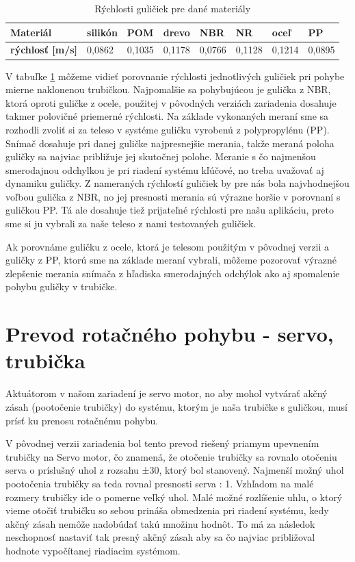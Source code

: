 \begin{table}[ht]
	\centering
	\begin{tabular}{|l|l|l|l|l|l|l|l|}
		\hline
		\textbf{Materiál}           & silikón & POM    & drevo  & NBR                            & NR     & oceľ                           & PP                             \\ \hline
		\textbf{rýchlosť {[}m/s{]}} & 0,0862  & 0,1035 & 0,1178 & \cellcolor[HTML]{9AFF99}0,0766 & 0,1128 & \cellcolor[HTML]{FFCCC9}0,1214 & \cellcolor[HTML]{FFFFFF}0,0895 \\ \hline
	\end{tabular}
    \caption{Rýchlosti guličiek pre dané materiály}
    \label{TABULKA_2_2}
\end{table}

V tabuľke \ref{TABULKA_2_2} môžeme vidieť porovnanie rýchlosti jednotlivých guličiek pri pohybe mierne naklonenou trubičkou. Najpomalšie sa pohybujúcou je gulička z NBR, ktorá oproti guličke z ocele, použitej v pôvodných verziách zariadenia dosahuje takmer polovičné priemerné rýchlosti.  
Na základe vykonaných meraní sme sa rozhodli zvoliť si za teleso v systéme guličku vyrobenú z polypropylénu (PP). Snímač dosahuje pri danej guličke najpresnejšie merania, takže meraná poloha guličky sa najviac približuje jej skutočnej polohe. Meranie s čo najmenšou smerodajnou odchylkou je pri riadení systému kľúčové, no treba uvažovať aj dynamiku guličky. Z nameraných rýchlostí guličiek by pre nás bola najvhodnejšou voľbou gulička z NBR, no jej presnosti merania sú výrazne horšie v porovnaní s guličkou PP. Tá ale dosahuje tiež prijateľné rýchlosti pre našu aplikáciu, preto sme si ju vybrali za naše teleso z nami testovaných guličiek.

Ak porovnáme guličku z ocele, ktorá je telesom použitým v pôvodnej verzii a guličky z PP, ktorú sme na základe meraní vybrali, môžeme pozorovať výrazné zlepšenie merania snímača z hľadiska smerodajných odchýlok ako aj spomalenie pohybu guličky v trubičke. 

\section{Prevod rotačného pohybu - servo, trubička}  
\label{kap:2.4}

Aktuátorom v našom zariadení je servo motor, no aby mohol vytvárať akčný zásah (pootočenie trubičky) do systému, ktorým je naša trubičke s guličkou, musí prísť ku prenosu rotačnému pohybu.
 
V pôvodnej verzii zariadenia bol tento prevod riešený priamym upevnením trubičky na Servo motor, čo znamená, že otočenie trubičky sa rovnalo otočeniu serva o príslušný uhol z rozsahu ±30\textdegree, ktorý bol stanovený. Najmenší možný uhol pootočenia trubičky sa teda rovnal presnosti serva : 1\textdegree. Vzhľadom na malé rozmery trubičky ide o pomerne veľký uhol. Malé možné rozlíšenie uhlu, o ktorý vieme otočiť trubičku so sebou prináša obmedzenia pri riadení systému, kedy akčný zásah nemôže nadobúdať takú množinu hodnôt. To má za následok neschopnosť nastaviť tak presný akčný zásah aby sa čo najviac približoval hodnote vypočítanej riadiacim systémom. 


